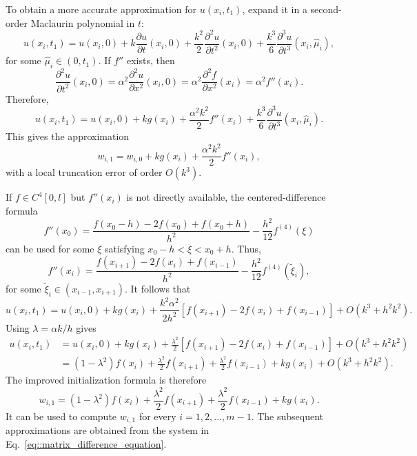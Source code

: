\documentclass[a4paper]{article}
\begin{document}
To obtain a more accurate approximation for $u(x_i,t_1)$, expand it in a second-order Maclaurin polynomial in $t$:
\begin{equation}
u(x_i,t_1)=u(x_i,0)+k\frac{\partial u}{\partial t}(x_i,0)+\frac{k^2}{2}\frac{\partial^2u}{\partial t^2}(x_i,0)+\frac{k^3}{6}\frac{\partial^3u}{\partial t^3}(x_i,\widehat{\mu}_i),
\end{equation}
for some $\widehat{\mu}_i\in(0,t_1)$. If $f''$ exists, then
\begin{equation}
\frac{\partial^2u}{\partial t^2}(x_i,0)=\alpha^2\frac{\partial^2u}{\partial x^2}(x_i,0)=\alpha^2\frac{\partial^2f}{\partial x^2}(x_i)=\alpha^2f''(x_i).
\end{equation}
Therefore,
\begin{equation}
u(x_i,t_1)=u(x_i,0)+kg(x_i)+\frac{\alpha^2k^2}{2}f''(x_i)+\frac{k^3}{6}\frac{\partial^3u}{\partial t^3}(x_i,\widehat{\mu}_i).
\end{equation}
This gives the approximation
\begin{equation}\label{eq::aprox_1}
w_{i,1}=w_{i,0}+kg(x_i)+\frac{\alpha^2k^2}{2}f''(x_i),
\end{equation}
with a local truncation error of order $O(k^3)$.

If $f\in C^4[0,l]$ but $f''(x_i)$ is not directly available, the centered-difference formula
\begin{equation}\label{eq::second_derivative_diff}
f''(x_0)=\frac{f(x_0-h)-2f(x_0)+f(x_0+h)}{h^2}-\frac{h^2}{12}f^{(4)}(\xi)
\end{equation}
can be used for some $\xi$ satisfying $x_0-h<\xi<x_0+h$. Thus,
\begin{equation}
f''(x_i)=\frac{f(x_{i+1})-2f(x_i)+f(x_{i-1})}{h^2}-\frac{h^2}{12}f^{(4)}(\widetilde{\xi}_i),
\end{equation}
for some $\widetilde{\xi}_i\in(x_{i-1},x_{i+1})$. It follows that
\begin{equation}
u(x_i,t_1)=u(x_i,0)+kg(x_i)+\frac{k^2\alpha^2}{2h^2}\left[f(x_{i+1})-2f(x_i)+f(x_{i-1})\right]+O(k^3+h^2k^2).
\end{equation}
Using $\lambda=\alpha k/h$ gives
\begin{equation}
\begin{aligned}
u(x_i,t_1)&=u(x_i,0)+kg(x_i)+\frac{\lambda^2}{2}\left[f(x_{i+1})-2f(x_i)+f(x_{i-1})\right]+O(k^3+h^2k^2)\\
&=(1-\lambda^2)f(x_i)+\frac{\lambda^2}{2}f(x_{i+1})+\frac{\lambda^2}{2}f(x_{i-1})+kg(x_i)+O(k^3+h^2k^2).
\end{aligned}
\end{equation}
The improved initialization formula is therefore
\begin{equation}\label{eq::aprox_improvement}
w_{i,1}=(1-\lambda^2)f(x_i)+\frac{\lambda^2}{2}f(x_{i+1})+\frac{\lambda^2}{2}f(x_{i-1})+kg(x_i).
\end{equation}
It can be used to compute $w_{i,1}$ for every $i=1,2,\ldots,m-1$. The subsequent approximations are obtained from the system in Eq.~\ref{eq::matrix_difference_equation}.
\end{document}
